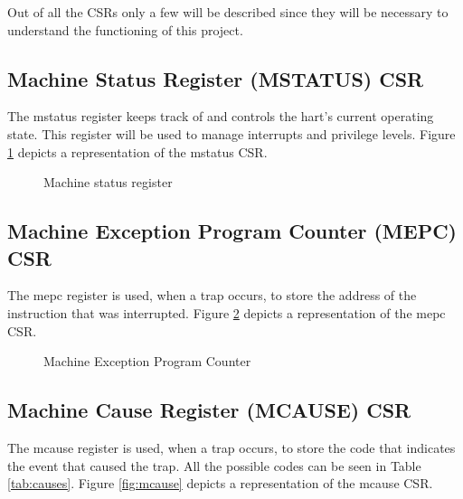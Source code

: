 Out of all the CSRs only a few will be described since they will be necessary to
understand the functioning of this project.

\subsection{Machine Status Register (MSTATUS) CSR}
\label{subsec:mstatus}

The mstatus register keeps track of and controls the hart’s current operating state.
This register will be used to manage interrupts and privilege levels. Figure \ref{fig:mstatus}
depicts a representation of the mstatus CSR.

\begin{figure}[htbp]
  \centering
  \def\stackalignment{r} %
  {\scriptsize }
  \caption{Machine status register}
  \label{fig:mstatus}
\end{figure}

\subsection{Machine Exception Program Counter (MEPC) CSR}
\label{subsec:mepc}

The mepc register is used, when a trap occurs, to store the address of the instruction
that was interrupted. Figure \ref{fig:mepc} depicts a representation of the mepc
CSR.

\begin{figure}[htbp]
  \centering
  \def\stackalignment{r} %
  {\scriptsize }
  \caption{Machine Exception Program Counter}
  \label{fig:mepc}
\end{figure}

\subsection{Machine Cause Register (MCAUSE) CSR}
\label{subsec:mcause}

The mcause register is used, when a trap occurs, to store the code that
indicates the event that caused the trap. All the possible codes can be seen in Table
\ref{tab:causes}. Figure \ref{fig:mcause} depicts a representation of the mcause
CSR.

